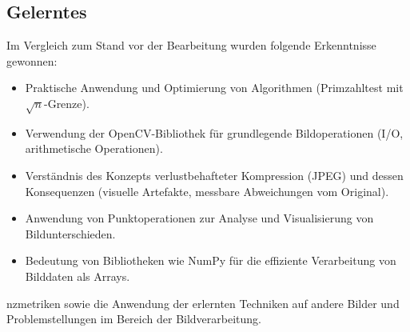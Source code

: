 \documentclass[titlepage]{article}
\begin{document}
\subsection{Gelerntes}
Im Vergleich zum Stand vor der Bearbeitung wurden folgende Erkenntnisse gewonnen:
\begin{itemize}
    \item Praktische Anwendung und Optimierung von Algorithmen (Primzahltest mit $\sqrt{n}$-Grenze).
    \item Verwendung der OpenCV-Bibliothek für grundlegende Bildoperationen (I/O, arithmetische Operationen).
    \item Verständnis des Konzepts verlustbehafteter Kompression (JPEG) und dessen Konsequenzen (visuelle Artefakte, messbare Abweichungen vom Original).
    \item Anwendung von Punktoperationen zur Analyse und Visualisierung von Bildunterschieden.
    \item Bedeutung von Bibliotheken wie NumPy für die effiziente Verarbeitung von Bilddaten als Arrays.
\end{itemize}
nzmetriken sowie die Anwendung der erlernten Techniken auf andere Bilder und Problemstellungen im Bereich der Bildverarbeitung.

\printbibliography
\end{document}
